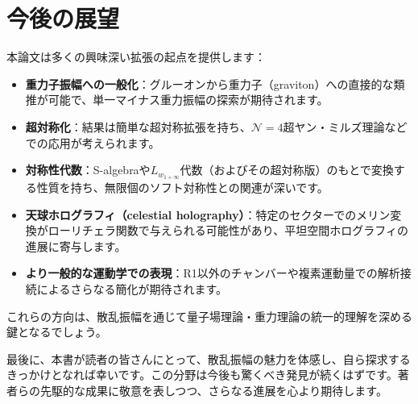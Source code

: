 \documentclass[dvipdfmx,a4paper]{jsbook}
\theoremstyle{definition}
\theoremstyle{remark}
\begin{document}
\section{今後の展望}

本論文は多くの興味深い拡張の起点を提供します：

\begin{itemize}
  \item \textbf{重力子振幅への一般化}：グルーオンから重力子（graviton）への直接的な類推が可能で、単一マイナス重力振幅の探索が期待されます。
  
  \item \textbf{超対称化}：結果は簡単な超対称拡張を持ち、$\mathcal{N}=4$超ヤン・ミルズ理論などでの応用が考えられます。
  
  \item \textbf{対称性代数}：S-algebraや$L_{w_{1+\infty}}$代数（およびその超対称版）のもとで変換する性質を持ち、無限個のソフト対称性との関連が深いです。
  
  \item \textbf{天球ホログラフィ（celestial holography）}：特定のセクターでのメリン変換がローリチェラ関数で与えられる可能性があり、平坦空間ホログラフィの進展に寄与します。
  
  \item \textbf{より一般的な運動学での表現}：R1以外のチャンバーや複素運動量での解析接続によるさらなる簡化が期待されます。
\end{itemize}

これらの方向は、散乱振幅を通じて量子場理論・重力理論の統一的理解を深める鍵となるでしょう。

最後に、本書が読者の皆さんにとって、散乱振幅の魅力を体感し、自ら探求するきっかけとなれば幸いです。この分野は今後も驚くべき発見が続くはずです。著者らの先駆的な成果に敬意を表しつつ、さらなる進展を心より期待します。
\end{document}
